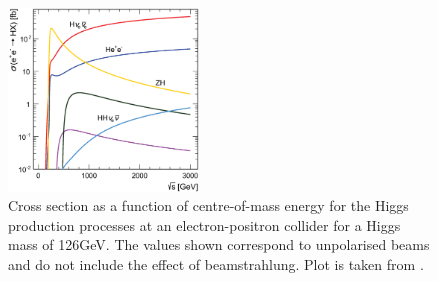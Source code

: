 \begin{figure}[!htbp]
\centering
\includegraphics[width=0.45\textwidth]{theory/HiggsCLICcrossSection}
\caption[]
{Cross section as a function of centre-of-mass energy for the Higgs production processes at an electron-positron collider for a Higgs mass of 126GeV. The values shown correspond
to unpolarised beams and do not include the effect of beamstrahlung. Plot is taken from \cite{Abramowicz:2016zbo}.}
\label{fig:theoryHiggsCrossSection}
\end{figure}




